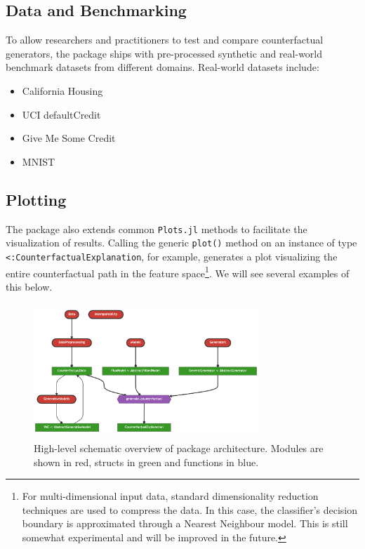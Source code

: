 \documentclass{juliacon}
\begin{document}
\hypertarget{data-and-benchmarking}{%
\subsection{Data and Benchmarking}\label{data-and-benchmarking}}

To allow researchers and practitioners to test and compare
counterfactual generators, the package ships with pre-processed
synthetic and real-world benchmark datasets from different domains.
Real-world datasets include:

\begin{itemize}
\item California Housing \cite{pace1997sparse}
\item UCI defaultCredit \cite{yeh2009comparisons}
\item Give Me Some Credit \cite{kaggle2011give}
\item MNIST \cite{lecun1998mnist}
\end{itemize}

\hypertarget{plotting}{%
\subsection{Plotting}\label{plotting}}

The package also extends common \texttt{Plots.jl} methods to facilitate
the visualization of results. Calling the generic \texttt{plot()} method
on an instance of type \texttt{\textless{}:CounterfactualExplanation},
for example, generates a plot visualizing the entire counterfactual path
in the feature space\footnote{For multi-dimensional input data, standard
  dimensionality reduction techniques are used to compress the data. In
  this case, the classifier's decision boundary is approximated through
  a Nearest Neighbour model. This is still somewhat experimental and
  will be improved in the future.}. We will see several examples of this
below.

\begin{figure}

{\centering \includegraphics[width=3.33333in,height=2in]{www/pkg_architecture.png}

}

\caption{\label{fig-arch}High-level schematic overview of package
architecture. Modules are shown in red, structs in green and functions
in blue.}

\end{figure}
\end{document}
